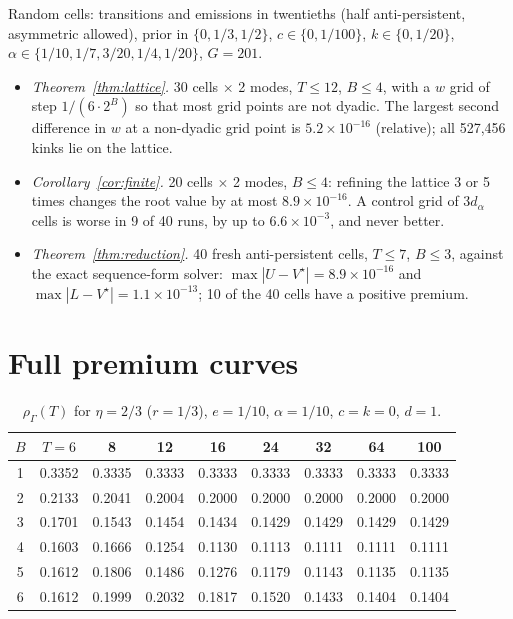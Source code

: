 \documentclass{article}
\theoremstyle{plain}
\theoremstyle{definition}
\theoremstyle{remark}
\newcommand{\rhoG}{\rho_\Gamma}
\begin{document}
Random cells: transitions and emissions in twentieths (half anti-persistent, asymmetric allowed), prior in $\{0,1/3,1/2\}$, $c\in\{0,1/100\}$, $k\in\{0,1/20\}$, $\alpha\in\{1/10,1/7,3/20,1/4,1/20\}$, $G=201$.
\begin{itemize}
\item \emph{Theorem~\ref{thm:lattice}.} 30 cells $\times$ 2 modes, $T\le12$, $B\le4$, with a $w$ grid of step $1/(6\cdot2^B)$ so that most grid points are not dyadic. The largest second difference in $w$ at a non-dyadic grid point is $5.2\times10^{-16}$ (relative); all 527{,}456 kinks lie on the lattice.
\item \emph{Corollary~\ref{cor:finite}.} 20 cells $\times$ 2 modes, $B\le4$: refining the lattice 3 or 5 times changes the root value by at most $8.9\times10^{-16}$. A control grid of $3d_\alpha$ cells is worse in 9 of 40 runs, by up to $6.6\times10^{-3}$, and never better.
\item \emph{Theorem~\ref{thm:reduction}.} 40 fresh anti-persistent cells, $T\le7$, $B\le3$, against the exact sequence-form solver: $\max|U-V^\star|=8.9\times10^{-16}$ and $\max|L-V^\star|=1.1\times10^{-13}$; 10 of the 40 cells have a positive premium.
\end{itemize}



\section{Full premium curves}
\label{app:curves}

\begin{table}[h]
\centering
\caption{$\rhoG(T)$ for $\eta=2/3$ ($r=1/3$), $e=1/10$, $\alpha=1/10$, $c=k=0$, $d=1$.}
\small
\begin{tabular}{ccccccccc}
\toprule
$B$ & $T=6$ & 8 & 12 & 16 & 24 & 32 & 64 & 100\\
\midrule
1 & 0.3352 & 0.3335 & 0.3333 & 0.3333 & 0.3333 & 0.3333 & 0.3333 & 0.3333\\
2 & 0.2133 & 0.2041 & 0.2004 & 0.2000 & 0.2000 & 0.2000 & 0.2000 & 0.2000\\
3 & 0.1701 & 0.1543 & 0.1454 & 0.1434 & 0.1429 & 0.1429 & 0.1429 & 0.1429\\
4 & 0.1603 & 0.1666 & 0.1254 & 0.1130 & 0.1113 & 0.1111 & 0.1111 & 0.1111\\
5 & 0.1612 & 0.1806 & 0.1486 & 0.1276 & 0.1179 & 0.1143 & 0.1135 & 0.1135\\
6 & 0.1612 & 0.1999 & 0.2032 & 0.1817 & 0.1520 & 0.1433 & 0.1404 & 0.1404\\
\bottomrule
\end{tabular}
\end{table}
\end{document}
